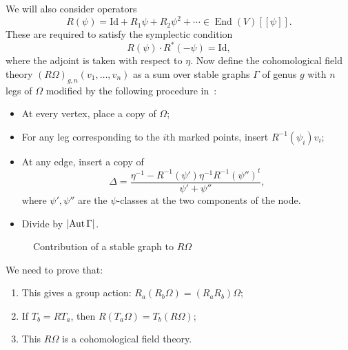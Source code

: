 \documentclass[leqno, openany]{memoir}
\theoremstyle{definition}
\theoremstyle{remark}
\theoremstyle{plain}
\theoremstyle{definition}
\theoremstyle{remark}
\newcommand{\mr}[1]{\mathrm{#1}}
\DeclareMathOperator{\End}{End}
\DeclareMathOperator{\Aut}{Aut}
\begin{document}
We will also consider operators
\[ R(\psi) = \mr{Id} + R_1 \psi + R_2 \psi^2 + \cdots \in \End(V)[[\psi]]. \]
These are required to satisfy the symplectic condition
\[ R(\psi) \cdot R^*(-\psi) = \mr{Id}, \]
where the adjoint is taken with respect to $\eta$. Now define the cohomological field theory $(R\Omega)_{g,n}(v_1,\ldots,v_n)$ as a sum over stable graphs $\Gamma$ of genus $g$ with $n$ legs of $\Omega$ modified by the following procedure in~:
\begin{itemize}
\item At every vertex, place a copy of $\Omega$;
\item For any leg corresponding to the $i$th marked points, insert $R^{-1}(\psi_i)v_i$;
\item At any edge, insert a copy of
  \[ \Delta = \frac{\eta^{-1} - R^{-1}(\psi')\eta^{-1} R^{-1}(\psi'')^t}{\psi' + \psi''}, \]
  where $\psi', \psi''$ are the $\psi$-classes at the two components of the node.
\item Divide by $\abs{\Aut \Gamma}$.
\end{itemize}
\begin{figure}[htpb]
  \centering
  \caption{Contribution of a stable graph to $R\Omega$}
  \label{fig:contribution}
\end{figure}

We need to prove that:
\begin{enumerate}
\item This gives a group action: $R_a(R_b \Omega) = (R_aR_b)\Omega$;
\item If $T_b = R T_a$, then $R(T_a\Omega) = T_b (R\Omega)$;
\item This $R\Omega$ is a cohomological field theory.
\end{enumerate}
\end{document}

